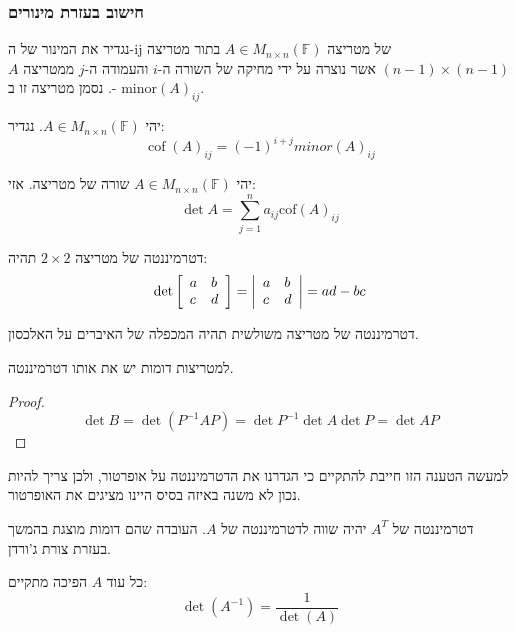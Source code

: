 \documentclass{tstextbook}
\begin{document}
\subsubsection{חישוב בעזרת מינורים}

\begin{definition}
נגדיר את המינור של ה-ij של מטריצה \(A\in M_{n\times n}\left( \mathbb{F}  \right)\) בתור מטריצה \((n-1)\times(n-1)\) אשר נוצרה על ידי מחיקה של השורה ה-\(i\) והעמודה ה-\(j\) ממטריצה \(A\). נסמן מטריצה זו ב- \(\text{minor}(A)_{ij}\).

\end{definition}
\begin{definition}
יהי \(A \in M_{n\times n}\left( \mathbb{F}  \right)\). נגדיר:
$$\operatorname{cof}(A)_{i j}=(-1)^{i+j}m i n o r(A)_{i j}$$

\end{definition}
\begin{proposition}
יהי \(A \in M_{n\times n}\left( \mathbb{F}  \right)\) שורה של מטריצה. אזי:
$$\det A=\sum_{j=1}^{n} a_{ij}\text{cof}(A)_{ij}$$

\end{proposition}
\begin{proposition}
דטרמיננטה של מטריצה \(2\times 2\) תהיה:
$$\operatorname*{det}{\left[\begin{array}{l l}{a}&{b}\\ {c}&{d}\end{array}\right]}={\left|\begin{array}{l l}{a}&{b}\\ {c}&{d}\end{array}\right|}=a d-b c$$

\end{proposition}
\begin{proposition}
דטרמיננטה של מטריצה משולשית תהיה המכפלה של האיברים על האלכסון.

\end{proposition}
\begin{proposition}
למטריצות דומות יש את אותו דטרמיננטה. 

\end{proposition}
\begin{proof}
$$\operatorname*{det}B=\operatorname*{det}(P^{-1}A P)=\operatorname*{det}P^{-1}\operatorname*{det}A\operatorname*{det}P=\operatorname*{det}A P$$

\end{proof}
\begin{remark}
למעשה הטענה הזו חייבת להתקיים כי הגדרנו את הדטרמיננטה על אופרטור, ולכן צריך להיות נכון לא משנה באיזה בסיס היינו מציגים את האופרטור.

\end{remark}
\begin{corollary}
דטרמיננטה של \(A^{T}\) יהיה שווה לדטרמיננטה של \(A\). העובדה שהם דומות מוצגת בהמשך בעזרת צורת ג'ורדן.

\end{corollary}
\begin{proposition}
כל עוד \(A\) הפיכה מתקיים:
$$\operatorname*{det}(A^{-1})={\frac{1}{\operatorname*{det}(A)}}$$

\end{proposition}
\end{document}
